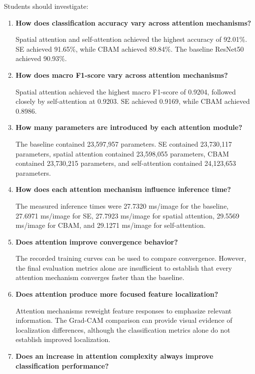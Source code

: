\documentclass[10pt]{article}
\begin{document}
Students should investigate:



\begin{enumerate}

\item \textbf{How does classification accuracy vary across attention mechanisms?}

Spatial attention and self-attention achieved the highest
accuracy of 92.01\%. SE achieved 91.65\%, while CBAM achieved
89.84\%. The baseline ResNet50 achieved 90.93\%.

\item \textbf{How does macro F1-score vary across attention mechanisms?}

Spatial attention achieved the highest macro F1-score of
0.9204, followed closely by self-attention at 0.9203.
SE achieved 0.9169, while CBAM achieved 0.8986.

\item \textbf{How many parameters are introduced by each attention module?}

The baseline contained 23,597,957 parameters. SE contained
23,730,117 parameters, spatial attention contained
23,598,055 parameters, CBAM contained 23,730,215 parameters,
and self-attention contained 24,123,653 parameters.

\item \textbf{How does each attention mechanism influence inference time?}

The measured inference times were 27.7320 ms/image for the
baseline, 27.6971 ms/image for SE, 27.7923 ms/image for
spatial attention, 29.5569 ms/image for CBAM, and
29.1271 ms/image for self-attention.

\item \textbf{Does attention improve convergence behavior?}

The recorded training curves can be used to compare convergence.
However, the final evaluation metrics alone are insufficient
to establish that every attention mechanism converges faster
than the baseline.

\item \textbf{Does attention produce more focused feature localization?}

Attention mechanisms reweight feature responses to emphasize
relevant information. The Grad-CAM comparison can provide
visual evidence of localization differences, although the
classification metrics alone do not establish improved
localization.

\item \textbf{Does an increase in attention complexity always improve classification performance?}


\end{enumerate}
\end{document}
